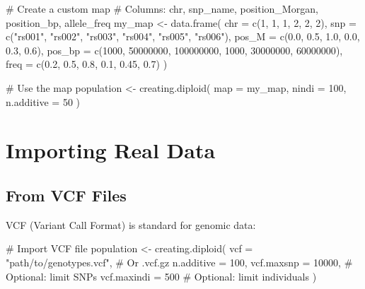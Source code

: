\documentclass[
  letterpaper,
]{book}
\newenvironment{Shaded}{\begin{snugshade}}{\end{snugshade}}
\newcommand{\AttributeTok}[1]{\textcolor[rgb]{0.40,0.45,0.13}{#1}}
\newcommand{\CommentTok}[1]{\textcolor[rgb]{0.37,0.37,0.37}{#1}}
\newcommand{\DecValTok}[1]{\textcolor[rgb]{0.68,0.00,0.00}{#1}}
\newcommand{\FloatTok}[1]{\textcolor[rgb]{0.68,0.00,0.00}{#1}}
\newcommand{\FunctionTok}[1]{\textcolor[rgb]{0.28,0.35,0.67}{#1}}
\newcommand{\NormalTok}[1]{\textcolor[rgb]{0.00,0.23,0.31}{#1}}
\newcommand{\OtherTok}[1]{\textcolor[rgb]{0.00,0.23,0.31}{#1}}
\newcommand{\StringTok}[1]{\textcolor[rgb]{0.13,0.47,0.30}{#1}}
\begin{document}
\begin{Shaded}
\begin{Highlighting}[]
\CommentTok{\# Create a custom map}
\CommentTok{\# Columns: chr, snp\_name, position\_Morgan, position\_bp, allele\_freq}
\NormalTok{my\_map }\OtherTok{\textless{}{-}} \FunctionTok{data.frame}\NormalTok{(}
  \AttributeTok{chr =} \FunctionTok{c}\NormalTok{(}\DecValTok{1}\NormalTok{, }\DecValTok{1}\NormalTok{, }\DecValTok{1}\NormalTok{, }\DecValTok{2}\NormalTok{, }\DecValTok{2}\NormalTok{, }\DecValTok{2}\NormalTok{),}
  \AttributeTok{snp =} \FunctionTok{c}\NormalTok{(}\StringTok{"rs001"}\NormalTok{, }\StringTok{"rs002"}\NormalTok{, }\StringTok{"rs003"}\NormalTok{, }\StringTok{"rs004"}\NormalTok{, }\StringTok{"rs005"}\NormalTok{, }\StringTok{"rs006"}\NormalTok{),}
  \AttributeTok{pos\_M =} \FunctionTok{c}\NormalTok{(}\FloatTok{0.0}\NormalTok{, }\FloatTok{0.5}\NormalTok{, }\FloatTok{1.0}\NormalTok{, }\FloatTok{0.0}\NormalTok{, }\FloatTok{0.3}\NormalTok{, }\FloatTok{0.6}\NormalTok{),}
  \AttributeTok{pos\_bp =} \FunctionTok{c}\NormalTok{(}\DecValTok{1000}\NormalTok{, }\DecValTok{50000000}\NormalTok{, }\DecValTok{100000000}\NormalTok{, }\DecValTok{1000}\NormalTok{, }\DecValTok{30000000}\NormalTok{, }\DecValTok{60000000}\NormalTok{),}
  \AttributeTok{freq =} \FunctionTok{c}\NormalTok{(}\FloatTok{0.2}\NormalTok{, }\FloatTok{0.5}\NormalTok{, }\FloatTok{0.8}\NormalTok{, }\FloatTok{0.1}\NormalTok{, }\FloatTok{0.45}\NormalTok{, }\FloatTok{0.7}\NormalTok{)}
\NormalTok{)}

\CommentTok{\# Use the map}
\NormalTok{population }\OtherTok{\textless{}{-}} \FunctionTok{creating.diploid}\NormalTok{(}
  \AttributeTok{map =}\NormalTok{ my\_map,}
  \AttributeTok{nindi =} \DecValTok{100}\NormalTok{,}
  \AttributeTok{n.additive =} \DecValTok{50}
\NormalTok{)}
\end{Highlighting}
\end{Shaded}

\section{Importing Real Data}\label{sec-import-real-data}

\subsection{From VCF Files}\label{from-vcf-files}

VCF (Variant Call Format) is standard for genomic data:

\begin{Shaded}
\begin{Highlighting}[]
\CommentTok{\# Import VCF file}
\NormalTok{population }\OtherTok{\textless{}{-}} \FunctionTok{creating.diploid}\NormalTok{(}
  \AttributeTok{vcf =} \StringTok{"path/to/genotypes.vcf"}\NormalTok{,  }\CommentTok{\# Or .vcf.gz}
  \AttributeTok{n.additive =} \DecValTok{100}\NormalTok{,}
  \AttributeTok{vcf.maxsnp =} \DecValTok{10000}\NormalTok{,             }\CommentTok{\# Optional: limit SNPs}
  \AttributeTok{vcf.maxindi =} \DecValTok{500}               \CommentTok{\# Optional: limit individuals}
\NormalTok{)}
\end{Highlighting}
\end{Shaded}
\end{document}
